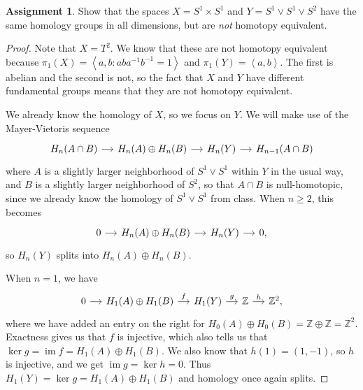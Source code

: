\documentclass[12pt]{article}
\DeclareMathOperator{\im}{im}
\theoremstyle{definition}
\newtheorem{ex}{Assignment}
\begin{document}
\begin{ex}
	Show that the spaces $X = S^1 \times S^1$ and $Y = S^1 \vee S^1 \vee S^2$ have the same homology groups in all dimensions, but are \textit{not} homotopy equivalent.
\end{ex}
\begin{proof}
	Note that $X = T^2$.
	We know that these are not homotopy equivalent because $\pi_1(X) = \left\langle a, b : aba^{-1}b^{-1} = 1 \right\rangle$ and $\pi_1(Y) = \left\langle a, b \right\rangle$.
	The first is abelian and the second is not, so the fact that $X$ and $Y$ have different fundamental groups means that they are not homotopy equivalent.

	We already know the homology of $X$, so we focus on $Y$.
	We will make use of the Mayer-Vietoris sequence \begin{equation*}
		\begin{tikzcd}[column sep=small]
			H_n(A \cap B) \arrow[r, ""] & H_n(A) \oplus H_n(B) \arrow[r, ""] & H_n(Y) \arrow[r, ""] & H_{n-1}(A \cap B)
		\end{tikzcd}
	\end{equation*} where $A$ is a slightly larger neighborhood of $S^1 \vee S^1$ within $Y$ in the usual way, and $B$ is a slightly larger neighborhood of $S^2$, so that $A \cap B$ is null-homotopic, since we already know the homology of $S^1 \vee S^1$ from class.
	When $n \geq 2$, this becomes \begin{equation*}
		\begin{tikzcd}[column sep=small]
			0 \arrow[r, ""] & H_n(A) \oplus H_n(B) \arrow[r, ""] & H_n(Y) \arrow[r, ""] & 0,
		\end{tikzcd}
	\end{equation*}
	so $H_n(Y)$ splits into $H_n(A) \oplus H_n(B)$.

	When $n = 1$, we have \begin{equation*}
		\begin{tikzcd}[column sep=small]
			0 \arrow[r, ""] & H_1(A) \oplus H_1(B) \arrow[r, "f"] & H_1(Y) \arrow[r, "g"] & \mathbb{Z} \arrow[r, "h"] & \mathbb{Z}^2,
		\end{tikzcd}
	\end{equation*}
	where we have added an entry on the right for $H_0(A) \oplus H_0(B) = \mathbb{Z} \oplus \mathbb{Z} = \mathbb{Z}^2$.
	Exactness gives us that $f$ is injective, which also tells us that $\ker g = \im f = H_1(A) \oplus H_1(B)$.
	We also know that $h(1) = (1, -1)$, so $h$ is injective, and we get $\im g = \ker h = 0$.
	Thus $H_1(Y) = \ker g = H_1(A) \oplus H_1(B)$ and homology once again splits.


\end{proof}
\end{document}
